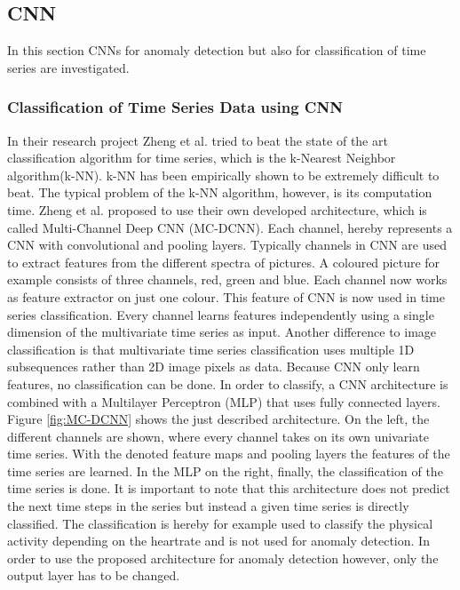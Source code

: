 \subsection{CNN}
In this section CNNs for anomaly detection but also for classification of time series are investigated. 

\subsubsection{Classification of Time Series Data using CNN}
In their research project Zheng et al. \parencite*{Zheng2014} tried to beat the state of the art classification algorithm for time series, which is the k-Nearest Neighbor algorithm(k-NN). k-NN has been empirically shown to be extremely difficult to beat. The typical problem of the k-NN algorithm, however, is its computation time. Zheng et al. proposed to use their own developed architecture, which is called Multi-Channel Deep CNN (MC-DCNN). Each channel, hereby represents a CNN with convolutional and pooling layers.
Typically channels in CNN are used to extract features from the different spectra of pictures. A coloured picture for example consists of three channels, red, green and blue. Each channel now works as feature extractor on just one colour.
This feature of CNN is now used in time series classification. Every channel learns features independently using a single dimension of the multivariate time series as input. Another difference to image classification is that multivariate time series classification uses multiple 1D subsequences rather than 2D image pixels as data. Because CNN only learn features, no classification can be done. In order to classify, a CNN architecture is combined with a Multilayer Perceptron (MLP) that uses fully connected layers. Figure \ref{fig:MC-DCNN} shows the just described architecture. On the left, the different channels are shown, where every channel takes on its own univariate time series. With the denoted feature maps and pooling layers the features of the time series are learned. In the MLP on the right, finally, the classification of the time series is done. 
It is important to note that this architecture does not predict the next time steps in the series but instead a given time series is directly classified. The classification is hereby for example used to classify the physical activity depending on the heartrate and is not used for anomaly detection. In order to use the proposed architecture for anomaly detection however, only the output layer has to be changed. 

